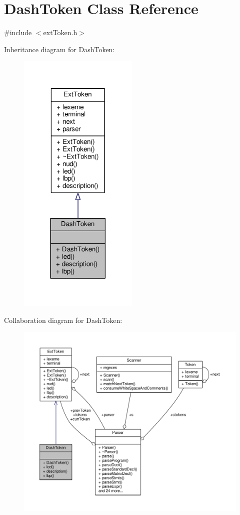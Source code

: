 \hypertarget{classDashToken}{\section{Dash\-Token Class Reference}
\label{classDashToken}
}


{\ttfamily \#include $<$ext\-Token.\-h$>$}



Inheritance diagram for Dash\-Token\-:\nopagebreak
\begin{figure}[H]
\begin{center}
\leavevmode
\includegraphics[width=162pt]{classDashToken__inherit__graph}
\end{center}
\end{figure}


Collaboration diagram for Dash\-Token\-:\nopagebreak
\begin{figure}[H]
\begin{center}
\leavevmode
\includegraphics[width=350pt]{classDashToken__coll__graph}
\end{center}
\end{figure}
